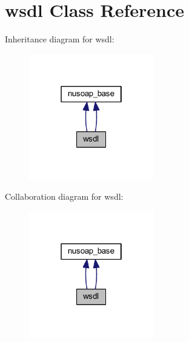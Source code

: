 \hypertarget{classwsdl}{\section{wsdl Class Reference}
\label{classwsdl}
}


Inheritance diagram for wsdl\-:
\nopagebreak
\begin{figure}[H]
\begin{center}
\leavevmode
\includegraphics[width=154pt]{classwsdl__inherit__graph}
\end{center}
\end{figure}


Collaboration diagram for wsdl\-:
\nopagebreak
\begin{figure}[H]
\begin{center}
\leavevmode
\includegraphics[width=154pt]{classwsdl__coll__graph}
\end{center}
\end{figure}
